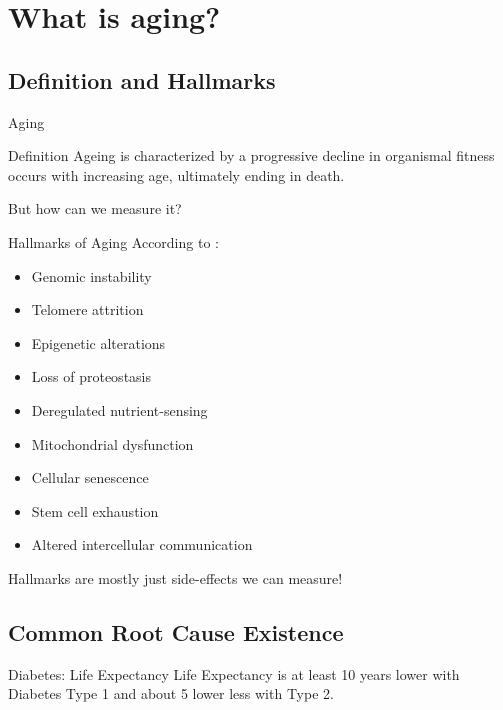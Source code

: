 \section{What is aging?}

\subsection{Definition and Hallmarks}

\begin{frame}[c]{Aging}
    \large
    
    \begin{block}{Definition}
        Ageing is characterized by a progressive decline in organismal fitness
        occurs with increasing age, ultimately ending in death.
    \end{block}
    \pause
    But how can we measure it?
\end{frame}


\begin{frame}[c]{Hallmarks of Aging}
    According to \cite{lopez2013hallmarks}:
    \begin{itemize}[<+(1)->]
        \item Genomic instability
        \item Telomere attrition
        \item Epigenetic alterations
        \item Loss of proteostasis
        \item Deregulated nutrient-sensing
        \item Mitochondrial dysfunction
        \item Cellular senescence
        \item Stem cell exhaustion
        \item Altered intercellular communication
    \end{itemize}
    \pause
    Hallmarks are mostly just side-effects we can measure!
\end{frame}


\subsection{Common Root Cause Existence}


\begin{frame}[c]{Diabetes: Life Expectancy}
    \large
    Life Expectancy is at least 10 years lower with Diabetes Type 1 \cite{livingstone2015estimated} and about 5 lower less with Type 2.
\end{frame}

